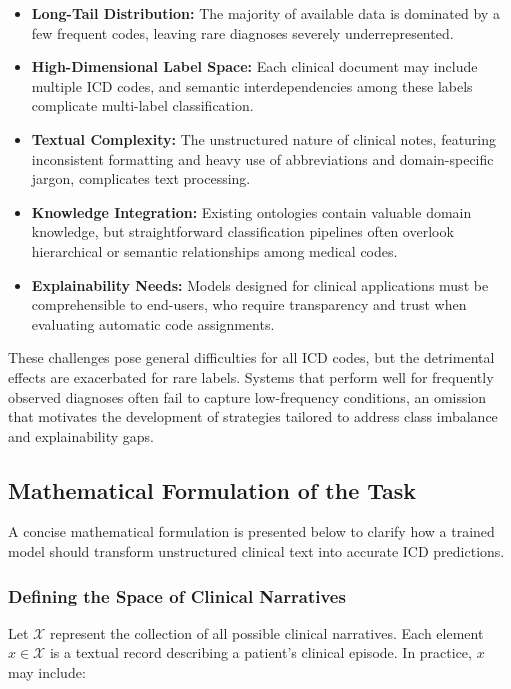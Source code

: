 \begin{itemize}
    \item \textbf{Long-Tail Distribution:} The majority of available data is dominated by a few frequent codes, leaving rare diagnoses severely underrepresented.
    \item \textbf{High-Dimensional Label Space:} Each clinical document may include multiple ICD codes, and semantic interdependencies among these labels complicate multi-label classification.
    \item \textbf{Textual Complexity:} The unstructured nature of clinical notes, featuring inconsistent formatting and heavy use of abbreviations and domain-specific jargon, complicates text processing.
    \item \textbf{Knowledge Integration:} Existing ontologies contain valuable domain knowledge, but straightforward classification pipelines often overlook hierarchical or semantic relationships among medical codes.
    \item \textbf{Explainability Needs:} Models designed for clinical applications must be comprehensible to end-users, who require transparency and trust when evaluating automatic code assignments.
\end{itemize}

These challenges pose general difficulties for all ICD codes, but the detrimental effects are exacerbated for rare labels. Systems that perform well for frequently observed diagnoses often fail to capture low-frequency conditions, an omission that motivates the development of strategies tailored to address class imbalance and explainability gaps.

\subsection{Mathematical Formulation of the Task}
\label{sec:p1:mathformulation}

A concise mathematical formulation is presented below to clarify how a trained model should transform unstructured clinical text into accurate ICD predictions.

\subsubsection{Defining the Space of Clinical Narratives}
Let \(\mathcal{X}\) represent the collection of all possible clinical narratives. Each element \(x \in \mathcal{X}\) is a textual record describing a patient's clinical episode. In practice, \(x\) may include:

